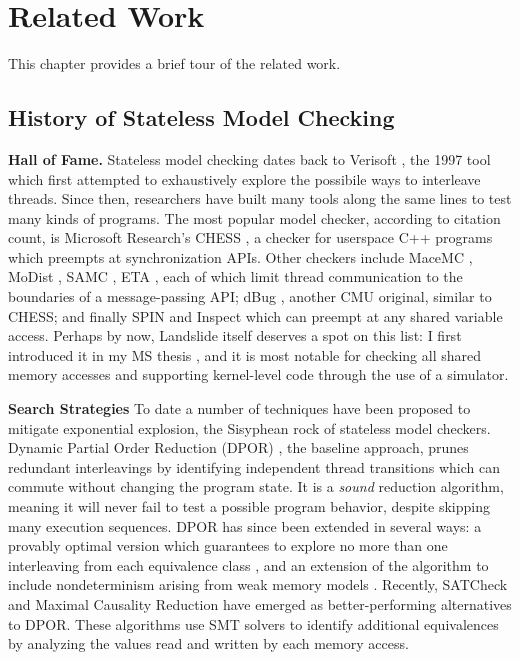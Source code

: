 \chapter{Related Work}
\label{chap:related}

This chapter provides a brief tour of the related work.

\section{History of Stateless Model Checking}

{\bf Hall of Fame.}
Stateless model checking dates back to Verisoft \cite{verisoft}, the 1997 tool which first attempted to exhaustively explore the possibile ways to interleave threads.
Since then, researchers have built many tools along the same lines to test many kinds of programs.
The most popular model checker, according to citation count, is Microsoft Research's CHESS \cite{chess},
a checker for userspace C++ programs which preempts at synchronization APIs.
%
Other checkers include MaceMC \cite{macemc}, MoDist \cite{modist}, SAMC \cite{samc}, ETA \cite{dbug-retreat},
each of which limit thread communication to the boundaries of a message-passing API;
%
dBug \cite{dbug-ssv}, another CMU original, similar to CHESS;
%
and finally SPIN \cite{spin} and Inspect \cite{inspect} which can preempt at any shared variable access.
%
Perhaps by now, Landslide itself deserves a spot on this list: I first introduced it in my MS thesis \cite{landslide},
and it is most notable for checking all shared memory accesses and supporting kernel-level code through the use of a simulator.

{\bf Search Strategies}
To date a number of techniques have been proposed to mitigate exponential explosion, the Sisyphean rock of stateless model checkers.
Dynamic Partial Order Reduction (DPOR) \cite{dpor}, the baseline approach, prunes redundant interleavings by identifying independent thread transitions which can commute without changing the program state.
It is a {\em sound} reduction algorithm, meaning it will never fail to test a possible program behavior, despite skipping many execution sequences.
DPOR has since been extended in several ways:
a provably optimal version which guarantees to explore no more than one interleaving from each equivalence class \cite{optimal-dpor},
and an extension of the algorithm to include nondeterminism arising from weak memory models \cite{tsopso}.
Recently, SATCheck and Maximal Causality Reduction have emerged as better-performing alternatives to DPOR.
These algorithms use SMT solvers \cite{z3} to identify additional equivalences by analyzing the values read and written by each memory access.

